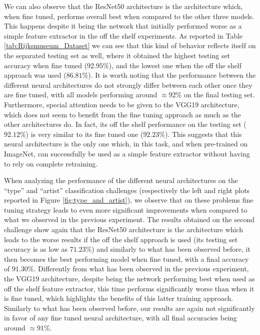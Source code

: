 We can also observe that the ResNet50 architecture is the architecture which, when fine tuned, performs overall best when compared to the other three models. This happens despite it being the network that initially performed worse as a simple feature extractor in the off the shelf experiments. As reported in Table \ref{tab:Rijksmuseum_Dataset} we can see that this kind of behavior reflects itself on the separated testing set as well, where it obtained the highest testing set accuracy when fine tuned ($92.95\%$), and the lowest one when the off the shelf approach was used ($86.81\%$). It is worth noting that the performance between the different neural architectures do not strongly differ between each other once they are fine tuned, with all models performing around $\approx 92\%$ on the final testing set. Furthermore, special attention needs to be given to the VGG19 architecture, which does not seem to benefit from the fine tuning approach as much as the other architectures do. In fact, its off the shelf performance on the testing set ($92.12\%$) is very similar to its fine tuned one ($92.23\%$). This suggests that this neural architecture is the only one which, in this task, and when pre-trained on ImageNet, can successfully be used as a simple feature extractor without having to rely on complete retraining. 

When analyzing the performance of the different neural architectures on the ``type'' and ``artist'' classification challenges (respectively the left and right plots reported in Figure \ref{fig:type_and_artist}), we observe that on these problems fine tuning strategy leads to even more significant improvements when compared to what we observed in the previous experiment. The results obtained on the second challenge show again that the ResNet50 architecture is the architecture which leads to the worse results if the off the shelf approach is used (its testing set accuracy is as low as $71.23\%$) and similarly to what has been observed before, it then becomes the best performing model when fine tuned, with a final accuracy of $91.30\%$. Differently from what has been observed in the previous experiment, the VGG19 architecture, despite being the network performing best when used as off the shelf feature extractor, this time performs significantly worse than when it is fine tuned, which highlights the benefits of this latter training approach. Similarly to what has been observed before, our results are again not significantly in favor of any fine tuned neural architecture, with all final accuracies being around $\approx 91\%$.

